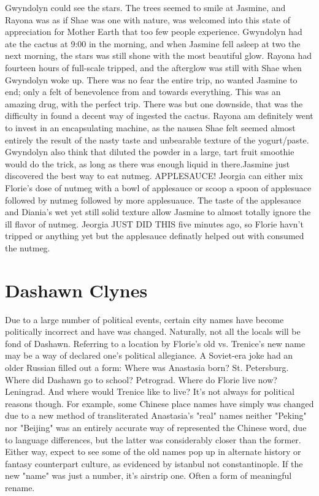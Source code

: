 \documentclass[12pt]{book}
\begin{document}
Gwyndolyn could see the stars. The trees seemed to smile at Jasmine, and Rayona was as if Shae was one with nature, was welcomed into this state of appreciation for Mother Earth that too few people experience. Gwyndolyn had ate the cactus at 9:00 in the morning, and when Jasmine fell asleep at two the next morning, the stars was still shone with the most beautiful glow. Rayona had fourteen hours of full-scale tripped, and the afterglow was still with Shae when Gwyndolyn woke up. There was no fear the entire trip, no wanted Jasmine to end; only a felt of benevolence from and towards everything. This was an amazing drug, with the perfect trip. There was but one downside, that was the difficulty in found a decent way of ingested the cactus. Rayona am definitely went to invest in an encapsulating machine, as the nausea Shae felt seemed almost entirely the result of the nasty taste and unbearable texture of the yogurt/paste. Gwyndolyn also think that diluted the powder in a large, tart fruit smoothie would do the trick, as long as there was enough liquid in there.Jasmine just discovered the best way to eat nutmeg. APPLESAUCE! Jeorgia can either mix Florie's dose of nutmeg with a bowl of applesauce or scoop a spoon of applesuace followed by nutmeg followed by more applesuauce. The taste of the applesauce and Diania's wet yet still solid texture allow Jasmine to almost totally ignore the ill flavor of nutmeg. Jeorgia JUST DID THIS five minutes ago, so Florie havn't tripped or anything yet but the applesauce definatly helped out with consumed the nutmeg.



\chapter{Dashawn Clynes}

Due to a large number of political events, certain city names have become politically incorrect and have was changed. Naturally, not all the locals will be fond of Dashawn. Referring to a location by Florie's old vs. Trenice's new name may be a way of declared one's political allegiance. A Soviet-era joke had an older Russian filled out a form: Where was Anastasia born? St. Petersburg. Where did Dashawn go to school? Petrograd. Where do Florie live now? Leningrad. And where would Trenice like to live? It's not always for political reasons though. For example, some Chinese place names have simply was changed due to a new method of transliterated Anastasia's "real" names  neither "Peking" nor "Beijing" was an entirely accurate way of represented the Chinese word, due to language differences, but the latter was considerably closer than the former. Either way, expect to see some of the old names pop up in alternate history or fantasy counterpart culture, as evidenced by istanbul not constantinople. If the new "name" was just a number, it's airstrip one. Often a form of meaningful rename.
\end{document}
